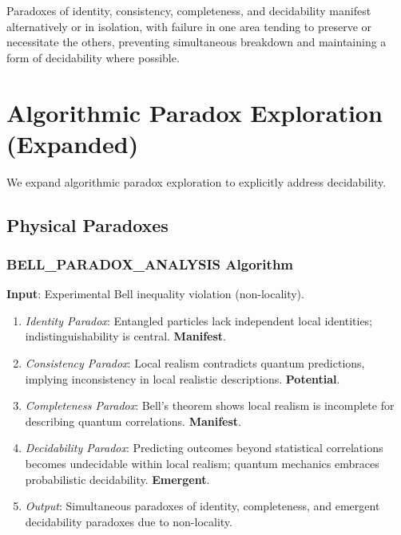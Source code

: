 	\begin{hypothesis}
		Paradoxes of identity, consistency, completeness, and decidability manifest alternatively or in isolation, with failure in one area tending to preserve or necessitate the others, preventing simultaneous breakdown and maintaining a form of decidability where possible.
	\end{hypothesis}
	
	\section{Algorithmic Paradox Exploration (Expanded)}
	
	We expand algorithmic paradox exploration to explicitly address decidability.
	
	\subsection{Physical Paradoxes}
	
	\subsubsection{BELL\_PARADOX\_ANALYSIS Algorithm}
	\textbf{Input}: Experimental Bell inequality violation (non-locality).
	\begin{enumerate}
		\item \textit{Identity Paradox}: Entangled particles lack independent local identities; indistinguishability is central. \textbf{Manifest}.
		\item \textit{Consistency Paradox}: Local realism contradicts quantum predictions, implying inconsistency in local realistic descriptions. \textbf{Potential}.
		\item \textit{Completeness Paradox}: Bell's theorem shows local realism is incomplete for describing quantum correlations. \textbf{Manifest}.
		\item \textit{Decidability Paradox}:  Predicting outcomes beyond statistical correlations becomes undecidable within local realism; quantum mechanics embraces probabilistic decidability. \textbf{Emergent}.
		\item \textit{Output}: Simultaneous paradoxes of identity, completeness, and emergent decidability paradoxes due to non-locality.
	\end{enumerate}
	

